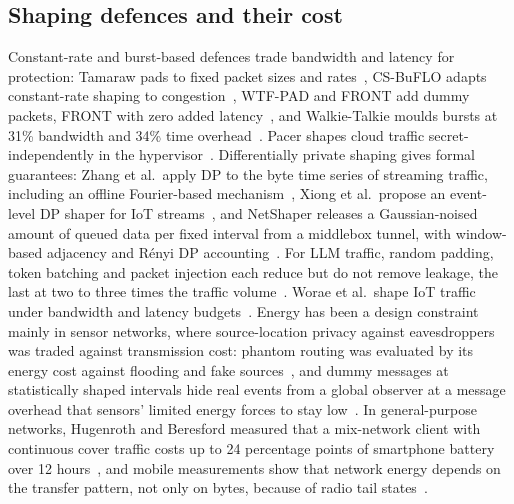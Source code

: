 \subsection{Shaping defences and their cost}
Constant-rate and burst-based defences trade bandwidth and latency for protection: Tamaraw pads to fixed packet sizes and rates~\cite{cai2014systematic}, CS-BuFLO adapts constant-rate shaping to congestion~\cite{cai2014csbuflo}, WTF-PAD and FRONT add dummy packets, FRONT with zero added latency~\cite{juarez2016toward,gong2020zero}, and Walkie-Talkie moulds bursts at 31\% bandwidth and 34\% time overhead~\cite{wang2017walkie}. Pacer shapes cloud traffic secret-independently in the hypervisor~\cite{mehta2022pacer}. Differentially private shaping gives formal guarantees: Zhang et al.\ apply DP to the byte time series of streaming traffic, including an offline Fourier-based mechanism~\cite{zhang2019statistical}, Xiong et al.\ propose an event-level DP shaper for IoT streams~\cite{xiong2021traffic}, and NetShaper releases a Gaussian-noised amount of queued data per fixed interval from a middlebox tunnel, with window-based adjacency and R\'enyi DP accounting~\cite{sabzi2024netshaper}. For LLM traffic, random padding, token batching and packet injection each reduce but do not remove leakage, the last at two to three times the traffic volume~\cite{mcdonald2025whisper}. Worae et al.\ shape IoT traffic under bandwidth and latency budgets~\cite{worae2026adaptive}. Energy has been a design constraint mainly in sensor networks, where source-location privacy against eavesdroppers was traded against transmission cost: phantom routing was evaluated by its energy cost against flooding and fake sources~\cite{kamat2005enhancing}, and dummy messages at statistically shaped intervals hide real events from a global observer at a message overhead that sensors' limited energy forces to stay low~\cite{shao2008towards}. In general-purpose networks, Hugenroth and Beresford measured that a mix-network client with continuous cover traffic costs up to 24 percentage points of smartphone battery over 12 hours~\cite{hugenroth2023powering}, and mobile measurements show that network energy depends on the transfer pattern, not only on bytes, because of radio tail states~\cite{balasubramanian2009energy,huang2012close}.

